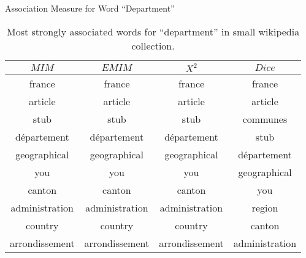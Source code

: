 \begin{table}[!htbp]
	\caption{Association Measure for Word ``Department''} \label{tab:department}
	\begin{center}
	\vspace{-5mm}
		\begin{tabular}{ c | c | c | c }
			\toprule
			$MIM$ & $EMIM$ & $X^2$ & $Dice$\\
			\midrule
france   &      france    &     france  &        france         \\
article  &      article   &     article &       article        \\
stub     &      stub      &     stub    &       communes       \\
département &   département &   département  &   stub           \\
geographical &   geographical &  geographical  &  département    \\
you          &   you          &  you          &   geographical   \\
canton       &  canton        &  canton       &   you            \\
administration & administration & administration & region         \\
country       & country     &   country    &     canton         \\
arrondissement & arrondissement & arrondissement & administration \\
			\bottomrule
		\end{tabular}
	\caption*{\scriptsize Most strongly associated words for ``department'' in small wikipedia collection.}
	 \end{center}
\end{table}

